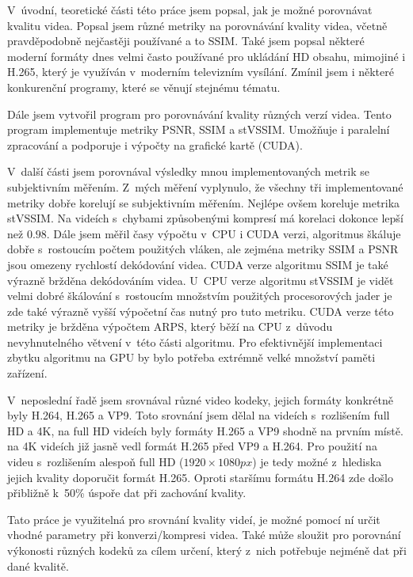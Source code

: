 \documentclass[thesis=M,czech]{FITthesis}[2016/06/26]
\begin{document}
\begin{conclusion}
V~úvodní, teoretické části této práce jsem popsal, jak je možné porovnávat kvalitu videa. Popsal jsem různé metriky na porovnávání kvality videa, včetně pravděpodobně nejčastěji používané a to SSIM. Také jsem popsal některé moderní formáty dnes velmi často používané pro ukládání HD obsahu, mimojiné i H.265, který je využíván v~moderním televizním vysílání. Zmínil jsem i některé konkurenční programy, které se věnují stejnému tématu.

Dále jsem vytvořil program pro porovnávání kvality různých verzí videa. Tento program implementuje metriky PSNR, SSIM a stVSSIM. Umožňuje i paralelní zpracování a podporuje i výpočty na grafické kartě (CUDA).

V~další části jsem porovnával výsledky mnou implementovaných metrik se subjektivním měřením. Z~mých měření vyplynulo, že všechny tři implementované metriky dobře korelují se subjektivním měřením. Nejlépe ovšem koreluje metrika stVSSIM. Na videích s~chybami způsobenými kompresí má korelaci dokonce lepší než $0.98$. Dále jsem měřil časy výpočtu v~CPU i CUDA verzi, algoritmus škáluje dobře s~rostoucím počtem použitých vláken, ale zejména metriky SSIM a PSNR jsou omezeny rychlostí dekódování videa. CUDA verze algoritmu SSIM je také výrazně bržděna dekódováním videa. U~CPU verze algoritmu stVSSIM je vidět velmi dobré škálování s~rostoucím množstvím použitých procesorových jader je zde také výrazně vyšší výpočetní čas nutný pro tuto metriku. CUDA verze této metriky je bržděna výpočtem ARPS, který běží na CPU z~důvodu nevyhnutelného větvení v~této části algoritmu. Pro efektivnější implementaci zbytku algoritmu na GPU by bylo potřeba extrémně velké množství paměti zařízení.

V~neposlední řadě jsem srovnával různé video kodeky, jejich formáty konkrétně byly H.264, H.265 a VP9. Toto srovnání jsem dělal na videích s~rozlišením full HD a 4K, na full HD videích byly formáty H.265 a VP9 shodně na prvním místě. na 4K videích již jasně vedl formát H.265 před VP9 a H.264. Pro použití na videu s~rozlišením alespoň full HD ($1920 \times 1080px$) je tedy možné z~hlediska jejich kvality doporučit formát H.265. Oproti staršímu formátu H.264 zde došlo přibližně k~50\% úspoře dat při zachování kvality.

Tato práce je využitelná pro srovnání kvality videí, je možné pomocí ní určit vhodné parametry při konverzi/kompresi videa. Také může sloužit pro porovnání výkonosti různých kodeků za cílem určení, který z~nich potřebuje nejméně dat při dané kvalitě.



\end{conclusion}
\end{document}
